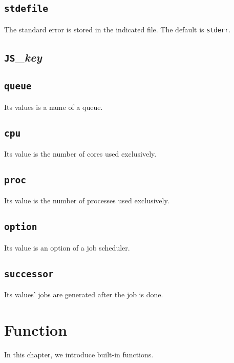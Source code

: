 \documentclass[a4paper,10pt]{report}
\begin{document}
\section{\texttt{stdefile}}

The standard error is stored in the indicated file.
The default is \texttt{stderr}.

\section{\texttt{JS}\_\textit{key}}

\section{\texttt{queue}}

Its values is a name of a queue.

\section{\texttt{cpu}}

Its value is the number of cores used exclusively.

\section{\texttt{proc}}

Its value is the number of processes used exclusively.

\section{\texttt{option}}

Its value is an option of a job scheduler.

\section{\texttt{successor}}

Its values' jobs are generated after the job is done.
\fi

\chapter{Function}\label{chapfun}

In this chapter, we introduce built-in functions.

\def\format{Format}
\def\example{Example}
\def\advanced{Advanced}
\end{document}
